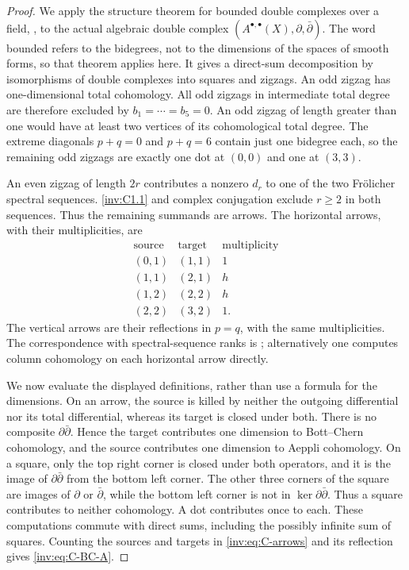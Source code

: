 \begin{proof}
We apply the structure theorem for bounded double complexes over a
field, \citet[Theorem 3]{Stelzig2021}, to the actual algebraic double
complex $(A^{\bullet,\bullet}(X),\partial,\bar\partial)$.
The word bounded refers to the bidegrees, not to the dimensions of the
spaces of smooth forms, so that theorem applies here.  It gives a
direct-sum decomposition by isomorphisms of double complexes into
squares and zigzags.  An odd zigzag has one-dimensional total
cohomology.  All odd zigzags in intermediate total degree are therefore
excluded by $b_1=\cdots=b_5=0$.  An odd zigzag of length greater than
one would have at least two vertices of its cohomological total degree.
The extreme diagonals $p+q=0$ and $p+q=6$ contain just one bidegree
each, so the remaining odd zigzags are exactly one dot at $(0,0)$ and
one at $(3,3)$.

An even zigzag of length $2r$ contributes a nonzero $d_r$ to one of
the two Fr\"olicher spectral sequences.  \ref{inv:C1.1} and complex conjugation
exclude $r\ge2$ in both sequences.  Thus the remaining summands are
arrows.  The horizontal arrows, with their multiplicities, are
\begin{equation}\label{inv:eq:C-arrows}
\begin{array}{c|c|r}
\text{source}&\text{target}&\text{multiplicity}\\\hline
(0,1)&(1,1)&1\\
(1,1)&(2,1)&h\\
(1,2)&(2,2)&h\\
(2,2)&(3,2)&1.
\end{array}
\end{equation}
The vertical arrows are their reflections in $p=q$, with the same
multiplicities.  The correspondence with spectral-sequence ranks is
\citet[Proposition 6(1)]{Stelzig2021}; alternatively one computes
column cohomology on each horizontal arrow directly.

We now evaluate the displayed definitions, rather than use a formula
for the dimensions.  On an arrow, the source is killed by neither
the outgoing differential nor its total differential, whereas its
target is closed under both.  There is no composite
$\partial\bar\partial$.  Hence the target contributes one dimension
to Bott--Chern cohomology, and the source contributes one dimension
to Aeppli cohomology.  On a square, only the top right corner is closed
under both operators, and it is the image of
$\partial\bar\partial$ from the bottom left corner.  The other
three corners of the square are images of $\partial$ or
$\bar\partial$, while the bottom left corner is not in
$\ker\partial\bar\partial$.  Thus a square contributes to neither
cohomology.  A dot contributes once to each.  These computations
commute with direct sums, including the possibly infinite sum of
squares.  Counting the sources and targets in \eqref{inv:eq:C-arrows}
and its reflection gives \eqref{inv:eq:C-BC-A}.


\end{proof}
